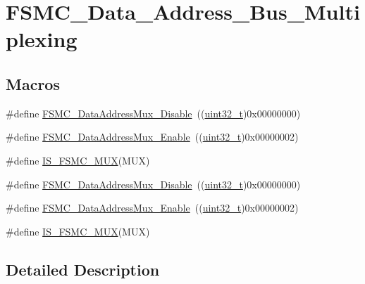 \hypertarget{group___f_s_m_c___data___address___bus___multiplexing}{}\section{F\+S\+M\+C\+\_\+\+Data\+\_\+\+Address\+\_\+\+Bus\+\_\+\+Multiplexing}
\label{group___f_s_m_c___data___address___bus___multiplexing}
\subsection*{Macros}
\begin{DoxyCompactItemize}
\item 
\#define \hyperlink{group___f_s_m_c___data___address___bus___multiplexing_ga62d92adbcbcc1d6ec9a04de1b343744a}{F\+S\+M\+C\+\_\+\+Data\+Address\+Mux\+\_\+\+Disable}~((\hyperlink{_p_e___types_8h_a33594304e786b158f3fb30289278f5af}{uint32\+\_\+t})0x00000000)
\item 
\#define \hyperlink{group___f_s_m_c___data___address___bus___multiplexing_ga1dd4d12e63aaf29dbb8ae4b613f2aa15}{F\+S\+M\+C\+\_\+\+Data\+Address\+Mux\+\_\+\+Enable}~((\hyperlink{_p_e___types_8h_a33594304e786b158f3fb30289278f5af}{uint32\+\_\+t})0x00000002)
\item 
\#define \hyperlink{group___f_s_m_c___data___address___bus___multiplexing_ga546fcab8c1b751b4a959ba2ce5b35d79}{I\+S\+\_\+\+F\+S\+M\+C\+\_\+\+M\+UX}(M\+UX)
\item 
\#define \hyperlink{group___f_s_m_c___data___address___bus___multiplexing_ga62d92adbcbcc1d6ec9a04de1b343744a}{F\+S\+M\+C\+\_\+\+Data\+Address\+Mux\+\_\+\+Disable}~((\hyperlink{_p_e___types_8h_a33594304e786b158f3fb30289278f5af}{uint32\+\_\+t})0x00000000)
\item 
\#define \hyperlink{group___f_s_m_c___data___address___bus___multiplexing_ga1dd4d12e63aaf29dbb8ae4b613f2aa15}{F\+S\+M\+C\+\_\+\+Data\+Address\+Mux\+\_\+\+Enable}~((\hyperlink{_p_e___types_8h_a33594304e786b158f3fb30289278f5af}{uint32\+\_\+t})0x00000002)
\item 
\#define \hyperlink{group___f_s_m_c___data___address___bus___multiplexing_ga546fcab8c1b751b4a959ba2ce5b35d79}{I\+S\+\_\+\+F\+S\+M\+C\+\_\+\+M\+UX}(M\+UX)
\end{DoxyCompactItemize}


\subsection{Detailed Description}


